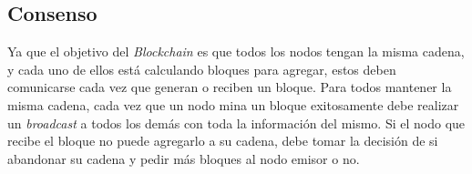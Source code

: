 \subsection{Consenso}
Ya que el objetivo del \textit{Blockchain} es que todos los nodos tengan la misma cadena, y cada uno de ellos est\'a calculando bloques para agregar, estos deben comunicarse cada vez que generan o reciben un bloque. Para todos mantener la misma cadena, cada vez que un nodo mina un bloque exitosamente debe realizar un \textit{broadcast} a todos los dem\'as con toda la informaci\'on del mismo. Si el nodo que recibe el bloque no puede agregarlo a su cadena, 
debe tomar la decisi\'on de si abandonar su cadena y pedir m\'as bloques al nodo emisor o no. 















